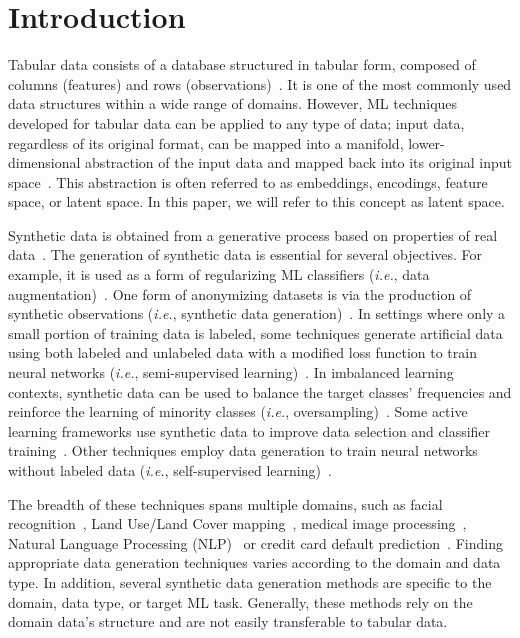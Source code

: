 \section{Introduction}\label{sec:introduction}


Tabular data consists of a database structured in tabular form, composed of
columns (features) and rows (observations)~\cite{yoon2020vime}. It is one of
the most commonly used data structures within a wide range of domains.
However, ML techniques developed for tabular data can be applied to any type
of data; input data, regardless of its original format, can be mapped into a
manifold, lower-dimensional abstraction of the input data and mapped back into
its original input space~\cite{kingma2019introduction, devries2017dataset}.
This abstraction is often referred to as embeddings, encodings, feature
space, or latent space. In this paper, we will refer to this concept as
latent space.

Synthetic data is obtained from a generative process based on properties of
real data~\cite{assefa2020generating}. The generation of synthetic data is
essential for several objectives. For example, it is used as a form of
regularizing ML classifiers (\textit{i.e.}, data
augmentation)~\cite{wang2021regularizing}. One form of anonymizing datasets is
via the production of synthetic observations (\textit{i.e.}, synthetic data
generation)~\cite{patki2016synthetic}. In settings where only a small portion
of training data is labeled, some techniques generate artificial data using
both labeled and unlabeled data with a modified loss function to train neural
networks (\textit{i.e.}, semi-supervised learning)~\cite{laine2017temporal}.
In imbalanced learning contexts, synthetic data can be used to balance the
target classes' frequencies and reinforce the learning of minority classes
(\textit{i.e.}, oversampling)~\cite{fonseca2021improving}. Some active
learning frameworks use synthetic data to improve data selection and
classifier training~\cite{kim2021lada}. Other techniques employ data
generation to train neural networks without labeled data (\textit{i.e.},
self-supervised learning)~\cite{grill2020bootstrap}.

The breadth of these techniques spans multiple domains, such as facial
recognition~\cite{lv2017data}, Land Use/Land Cover
mapping~\cite{douzas2019imbalanced}, medical image
processing~\cite{yi2019generative}, Natural Language Processing
(NLP)~\cite{feng2021survey} or credit card default
prediction~\cite{alam2020investigation}. Finding appropriate data
generation techniques varies according to the domain and data type. In
addition, several synthetic data generation methods are specific to the
domain, data type, or target ML task. Generally, these methods rely on
the domain data's structure and are not easily transferable to tabular
data.

